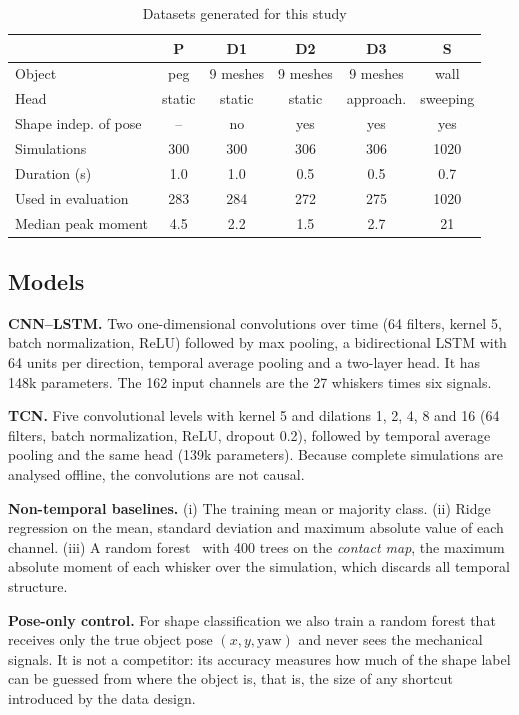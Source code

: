 \documentclass[conference]{IEEEtran}
\begin{document}
\begin{table}[t]
\caption{Datasets generated for this study}
\label{tab:datasets}
\centering
\setlength{\tabcolsep}{3pt}
\begin{tabular}{@{}lccccc@{}}
\toprule
 & P & D1 & D2 & D3 & S \\
\midrule
Object & peg & 9 meshes & 9 meshes & 9 meshes & wall \\
Head & static & static & static & approach. & sweeping \\
Shape indep. of pose & -- & no & yes & yes & yes \\
Simulations & 300 & 300 & 306 & 306 & 1020 \\
Duration (s) & 1.0 & 1.0 & 0.5 & 0.5 & 0.7 \\
Used in evaluation & 283 & 284 & 272 & 275 & 1020 \\
Median peak moment & 4.5 & 2.2 & 1.5 & 2.7 & 21 \\
\bottomrule
\end{tabular}
\end{table}

\subsection{Models}
\textbf{CNN--LSTM.} Two one-dimensional convolutions over time (64 filters, kernel 5, batch normalization, ReLU) followed by max pooling, a bidirectional LSTM with 64 units per direction, temporal average pooling and a two-layer head. It has 148k parameters. The 162 input channels are the 27 whiskers times six signals.

\textbf{TCN.} Five convolutional levels with kernel 5 and dilations 1, 2, 4, 8 and 16 (64 filters, batch normalization, ReLU, dropout 0.2), followed by temporal average pooling and the same head (139k parameters). Because complete simulations are analysed offline, the convolutions are not causal.

\textbf{Non-temporal baselines.} (i) The training mean or majority class. (ii) Ridge regression on the mean, standard deviation and maximum absolute value of each channel. (iii) A random forest~\cite{breiman2001} with 400 trees on the \emph{contact map}, the maximum absolute moment of each whisker over the simulation, which discards all temporal structure.

\textbf{Pose-only control.} For shape classification we also train a random forest that receives only the true object pose $(x,y,\text{yaw})$ and never sees the mechanical signals. It is not a competitor: its accuracy measures how much of the shape label can be guessed from where the object is, that is, the size of any shortcut introduced by the data design.
\end{document}
